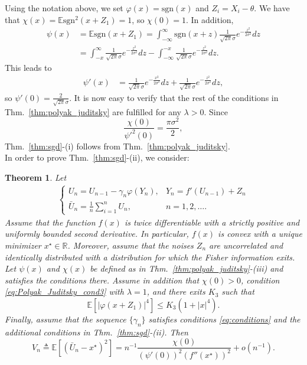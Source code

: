 \documentclass[letterpaper, conference,9pt]{IEEEtran}      %
\newtheorem{thm}{\bf{Theorem}}
\newcommand{\sgn}{\mathrm{sgn} }
\begin{document}
Using the notation above, we set $\varphi(x) = \sgn(x)$ and $Z_i = X_i - \theta$. We have that $\chi(x) = \mathbb E \sgn^2(x+Z_1) = 1$, so $\chi(0) = 1$. In addition,
\begin{align*}
\psi(x) & = \mathbb E \sgn(x+ Z_1) = \int_{-\infty}^\infty \sgn(x+z) \frac{1}{\sqrt{2\pi}\sigma} e^{-\frac{z^2}{2\sigma^2}} dz \\
& = \int_{-x}^\infty \frac{1}{\sqrt{2\pi}\sigma} e^{-\frac{z^2}{2\sigma^2}} dz -\int_{-\infty}^{-x} \frac{1}{\sqrt{2\pi}\sigma} e^{-\frac{z^2}{2\sigma^2}} dz.
\end{align*}
This leads to 
\begin{align*}
\psi'(x) & = \frac{1}{\sqrt{2\pi}\sigma} e^{-\frac{x^2}{2\sigma^2}} dz +\frac{1}{\sqrt{2\pi}\sigma} e^{-\frac{z^2}{2\sigma^2}} dz,
\end{align*}
so $\psi'(0) = \frac{2}{\sqrt{2\pi}\sigma}$. It is now easy to verify that the rest of the conditions in Thm.~\ref{thm:polyak_juditsky} are fulfilled for any $\lambda > 0$. Since 
\[
\frac{\chi(0)}{\psi'^2(0)} = \frac{\pi \sigma^2}{2},
\]
Thm.~\ref{thm:sgd}-(i) follows from Thm.~\ref{thm:polyak_juditsky}.  \\
In order to prove Thm.~\ref{thm:sgd}-(ii), we consider:
\begin{thm}{ \cite[Thm. 2]{polyak1990new}} \label{thm:polyak_new}
Let
\begin{align} \label{eq:polyak_new_measurements}
\begin{cases}
U_n = U_{n-1} - \gamma_n \varphi(Y_n), & Y_n = f'(U_{n-1})+Z_n \\
\bar{U}_n= \frac{1}{n} \sum_{i=1}^n U_n, & n=1,2,\ldots.
\end{cases}
\end{align}
Assume that the function $f(x)$ is twice differentiable with a strictly positive and uniformly bounded second derivative. In particular, $f(x)$ is convex with a unique minimizer $x^\star \in \mathbb R$. Moreover, assume that the noises $Z_n$ are uncorrelated and identically distributed with a distribution for which the Fisher information exits. Let $\psi(x)$ and $\chi(x)$ be defined as in  Thm.~\ref{thm:polyak_juditsky}-(iii) and satisfies the conditions there. Assume in addition that $\chi(0)>0$, condition \eqref{eq:Polyak_Juditsky_cond3} with $\lambda = 1$, 
and there exits $K_3$ such that 
\[
\mathbb E \left[ | \varphi(x+Z_1) |^4 \right] \leq K_3(1+|x|^4). 
\]
Finally, assume that the sequence $\{\gamma_n \}$ satisfies conditions \eqref{eq:conditions} and the additional conditions in Thm.~\ref{thm:sgd}-(ii). Then
\[
V_n \triangleq \mathbb E \left[ \left(\bar{U}_n-x^\star \right)^2 \right] = n^{-1}\frac{\chi(0)} { (\psi'(0))^2 (f''(x^\star))^2 } + o(n^{-1}).
\]
\end{thm}
\end{document}
